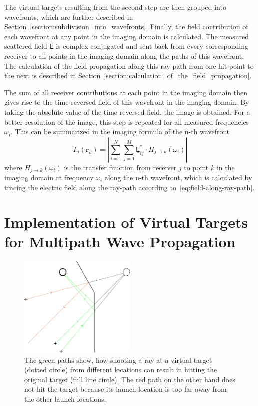 The virtual targets resulting from the second step are then grouped into wavefronts, which are further described in Section~\ref{section:subdivision_into_wavefronts}.
Finally, the field contribution of each wavefront at any point in the imaging domain is calculated.
The measured scattered field \(\underline{\mathsf{E}}\) is complex conjugated and sent back from every corresponding receiver to all points in the imaging domain along the paths of this wavefront.
The calculation of the field propagation along this ray-path from one hit-point to the next is described in Section~\ref{section:calculation_of_the_field_propagation}.

The sum of all receiver contributions at each point in the imaging domain then gives rise to the time-reversed field of this wavefront in the imaging domain.
By taking the absolute value of the time-reversed field, the image is obtained.
For a better resolution of the image, this step is repeated for all measured frequencies \(\omega_i\).
This can be summarized in the imaging formula of the n-th wavefront
\begin{equation}
    I_n(\bm{r}_k) = |\sum_{i=1}^{N} \sum_{j=1}^{M} \underline{\mathsf{E}}_{ij}^* \cdot H_{j \rightarrow k}(\omega_i)|
\end{equation}
where \(H_{j \rightarrow k}(\omega_i)\) is the transfer function from receiver \(j\) to point \(k\) in the imaging domain at frequency \(\omega_i\) along the n-th wavefront, which is calculated by tracing the electric field along the ray-path according to~\eqref{eq:field-along-ray-path}.


\section{Implementation of Virtual Targets for Multipath Wave Propagation}\label{section:virtual_targets}

\begin{figure}[ht]
    \centering
    \includegraphics[width=0.5\textwidth]{figures/VirtualTargets.pdf}
    \caption{The green paths show, how shooting a ray at a virtual target (dotted circle) from different locations can result in hitting the original target (full line circle). The red path on the other hand does not hit the target because its launch location is too far away from the other launch locations.}\label{fig:virtual_targets}
\end{figure}

